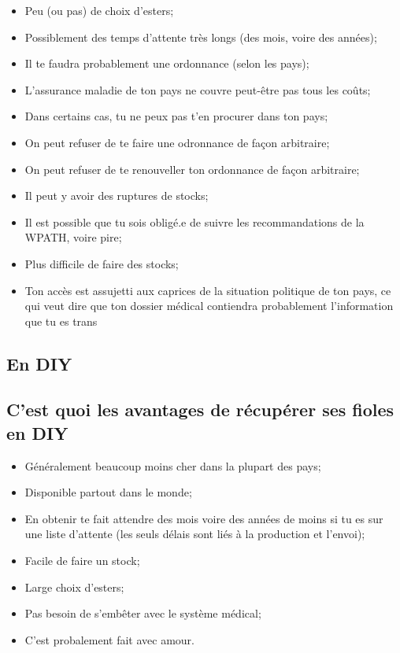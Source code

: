 \documentclass{article}
\begin{document}
\begin{itemize}
  \item Peu (ou pas) de choix d'esters;
  \item Possiblement des temps d'attente très longs (des mois, voire des années);
  \item Il te faudra probablement une ordonnance (selon les pays);
  \item L'assurance maladie de ton pays ne couvre peut-être pas tous les coûts;
  \item Dans certains cas, tu ne peux pas t'en procurer dans ton pays;
  \item On peut refuser de te faire une odronnance de façon arbitraire;
  \item On peut refuser de te renouveller ton ordonnance de façon arbitraire;
  \item Il peut y avoir des ruptures de stocks;
  \item Il est possible que tu sois obligé.e de suivre les recommandations de la WPATH, voire pire;
  \item Plus difficile de faire des stocks;
  \item Ton accès est assujetti aux caprices de la situation politique de ton pays, ce qui veut dire que ton dossier médical contiendra probablement l'information que tu es trans
\end{itemize}

\subsection*{En DIY}

\subsection{C'est quoi les avantages de récupérer ses fioles en DIY}

\begin{itemize}
\item Généralement beaucoup moins cher dans la plupart des pays;
\item Disponible partout dans le monde;
\item En obtenir te fait attendre des mois voire des années de moins si tu es sur une liste d'attente (les seuls délais sont liés à la production et l'envoi);
\item Facile de faire un stock;
\item Large choix d'esters;
\item Pas besoin de s'embêter avec le système médical;
\item C'est probalement fait avec amour.
\end{itemize}
\end{document}
